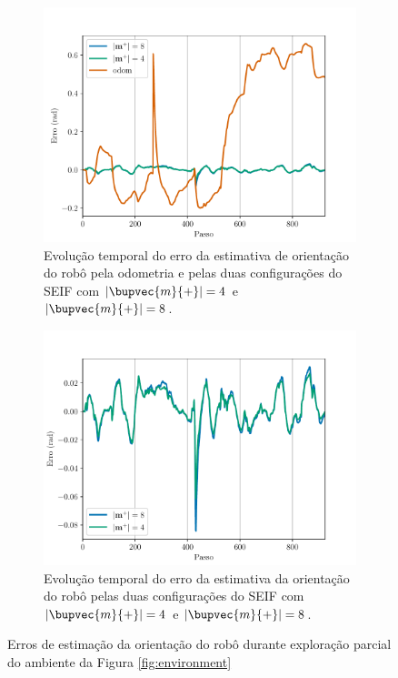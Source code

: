 \begin{figure}
  \centering
  \begin{subfigure}{.75\textwidth}
    \includegraphics[width=\textwidth]{figs/theta-error-odom-seif.pdf} 
    \caption{Evolução temporal do erro da estimativa de orientação do robô pela odometria e pelas duas configurações do SEIF com $\lvert \bupvec{m}{+}\rvert = 4 $ e $\lvert \bupvec{m}{+}\rvert = 8 $.}
    \label{fig:theta-error-odom-and-seifs}
  \end{subfigure}
  \begin{subfigure}{.75\textwidth}
    \includegraphics[width=\textwidth]{figs/theta-error-seifs.pdf} 
    \caption{Evolução temporal do erro da estimativa da orientação do robô pelas duas configurações do SEIF com $\lvert \bupvec{m}{+}\rvert = 4 $ e $\lvert \bupvec{m}{+}\rvert = 8 $.}
    \label{fig:theta-error-seifs}
  \end{subfigure}
  \caption{Erros de estimação da orientação do robô durante exploração parcial do ambiente da Figura \ref{fig:environment}}
  \label{fig:theta-error}
\end{figure}

